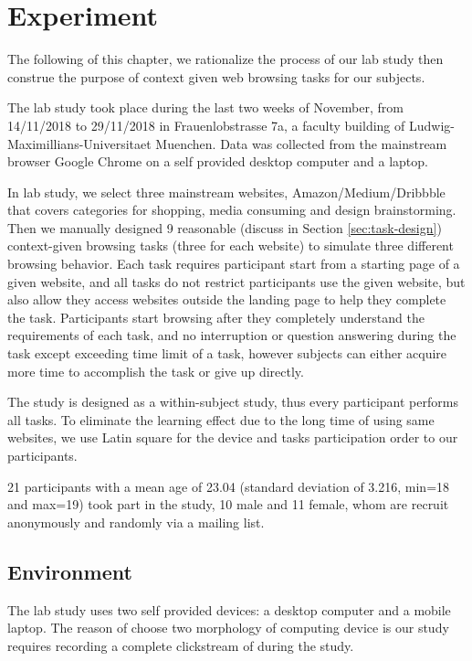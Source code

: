 \section{Experiment}
\label{ch:exp}

The following of this chapter, we rationalize the process of our lab study then construe the purpose of context given web browsing tasks for our subjects.

The lab study took place during the last two weeks of November, from 14/11/2018 to 29/11/2018
in Frauenlobstrasse 7a, a faculty building of Ludwig-Maximillians-Universitaet Muenchen.
Data was collected from the mainstream browser Google Chrome on a self provided 
desktop computer and a laptop.

In lab study, we select three mainstream websites, Amazon/Medium/Dribbble 
that covers categories for shopping, media consuming and design brainstorming. 
Then we manually designed 9 reasonable (discuss in Section \ref{sec:task-design})
context-given browsing tasks (three for each website) to simulate three different browsing behavior.
Each task requires participant start from a starting page of a given website, and
all tasks do not restrict participants use the given website, but also allow they 
access websites outside the landing page to help they complete the task.
Participants start browsing after they completely understand the requirements of 
each task, and no interruption or question answering during the task
except exceeding time limit of a task, however subjects can either acquire more time 
to accomplish the task or give up directly.

The study is designed as a within-subject study, thus every participant performs all tasks. To eliminate the learning effect due to the long time of using same websites, 
we use Latin square \cite{cochran1950experimental} 
for the device and tasks participation order to our participants.

21 participants with a mean age of 23.04 (standard deviation of 3.216, min=18 and max=19) 
took part in the study, 10 male and 11 female, whom are recruit anonymously and randomly via a mailing list.

\subsection{Environment}

The lab study uses two self provided devices: a desktop computer and a mobile laptop.
The reason of choose two morphology of computing device is our study requires recording
a complete clickstream of during the study.


